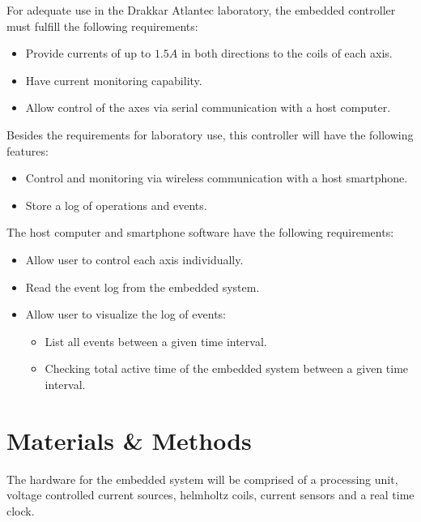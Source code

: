 \documentclass[10pt,twocolumn,letterpaper]{article}
\begin{document}
For adequate use in the Drakkar Atlantec laboratory, the embedded controller must fulfill the following requirements:
\begin{itemize}
  \item Provide currents of up to $1.5 A$ in both directions to the coils of each axis.
  \item Have current monitoring capability.
  \item Allow control of the axes via serial communication with a host computer.
\end{itemize}

Besides the requirements for laboratory use, this controller will have the following features:
\begin{itemize}
  \item Control and monitoring via wireless communication with a host smartphone.
  \item Store a log of operations and events.
\end{itemize}

The host computer and smartphone software have the following requirements:
\begin{itemize}
  \item Allow user to control each axis individually.
  \item Read the event log from the embedded system.
  \item Allow user to visualize the log of events:
  \begin{itemize}
    \item List all events between a given time interval.
    \item Checking total active time of the embedded system between a given time interval.
  \end{itemize}
\end{itemize}

\section{Materials \& Methods}

The hardware for the embedded system will be comprised of a processing unit, voltage controlled current sources, helmholtz coils, current sensors and a real time clock.
\end{document}
